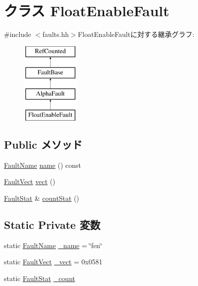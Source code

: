 \hypertarget{classAlphaISA_1_1FloatEnableFault}{
\section{クラス FloatEnableFault}
\label{classAlphaISA_1_1FloatEnableFault}
}


{\ttfamily \#include $<$faults.hh$>$}FloatEnableFaultに対する継承グラフ:\begin{figure}[H]
\begin{center}
\leavevmode
\includegraphics[height=4cm]{classAlphaISA_1_1FloatEnableFault}
\end{center}
\end{figure}
\subsection*{Public メソッド}
\begin{DoxyCompactItemize}
\item 
\hyperlink{sim_2faults_8hh_abb196df64725e5c2568c900cf130d8d7}{FaultName} \hyperlink{classAlphaISA_1_1FloatEnableFault_a73adb23259baf912a81683a9790a303f}{name} () const 
\item 
\hyperlink{classm5_1_1params_1_1Addr}{FaultVect} \hyperlink{classAlphaISA_1_1FloatEnableFault_ae15c5d7ab0162821b93d668d0b225198}{vect} ()
\item 
\hyperlink{classStats_1_1Scalar}{FaultStat} \& \hyperlink{classAlphaISA_1_1FloatEnableFault_a6c79663c761ff57265459f7e3aefaf4c}{countStat} ()
\end{DoxyCompactItemize}
\subsection*{Static Private 変数}
\begin{DoxyCompactItemize}
\item 
static \hyperlink{sim_2faults_8hh_abb196df64725e5c2568c900cf130d8d7}{FaultName} \hyperlink{classAlphaISA_1_1FloatEnableFault_ac79073ffcd2c66a09bcd3bd3ad206019}{\_\-name} = \char`\"{}fen\char`\"{}
\item 
static \hyperlink{classm5_1_1params_1_1Addr}{FaultVect} \hyperlink{classAlphaISA_1_1FloatEnableFault_ad9e5855b9db0b2824cf6c507be4a872e}{\_\-vect} = 0x0581
\item 
static \hyperlink{classStats_1_1Scalar}{FaultStat} \hyperlink{classAlphaISA_1_1FloatEnableFault_a4bff925c412f331c5aaf6a39b79619ff}{\_\-count}
\end{DoxyCompactItemize}


